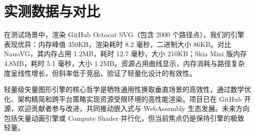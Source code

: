 \chapter{实测数据与对比}
在测试场景中，渲染 GitHub Octocat SVG（包含 2000 个路径点），我们的引擎表现优异：内存峰值 350KB，渲染耗时 8.2 毫秒，二进制大小 86KB。对比 NanoVG，其内存占用 1.2MB，耗时 12.7 毫秒，大小 210KB；Skia Mini 版内存 4.8MB，耗时 5.1 毫秒，大小 1.2MB。资源占用曲线显示，内存消耗与路径复杂度呈线性增长，但斜率低于竞品，验证了轻量化设计的有效性。\par
轻量级矢量图形引擎的核心哲学是牺牲通用性换取垂直场景的高效性，通过数学优化、架构精简和跨平台策略实现资源受限环境的高性能渲染。项目已在 GitHub 开源，欢迎贡献者参与改进，共同推动嵌入式与 WebAssembly 生态发展。未来方向包括矢量动画引擎或 Compute Shader 并行化，但当前焦点仍是保持引擎的极致轻量。\par

